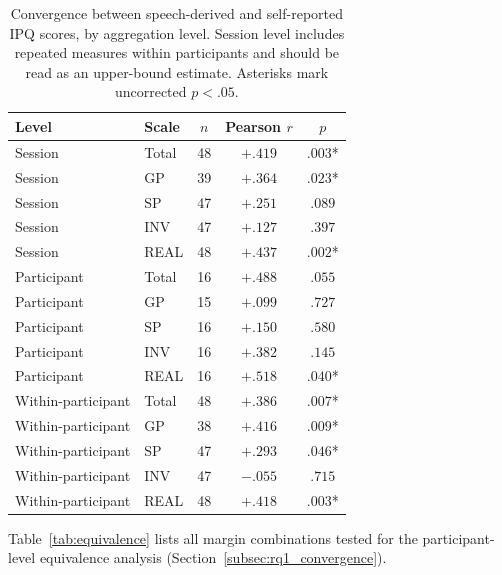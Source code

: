 \begin{table}[htbp]
\centering
\caption{Convergence between speech-derived and self-reported IPQ scores, by aggregation level. Session level includes repeated measures within participants and should be read as an upper-bound estimate. Asterisks mark uncorrected $p<.05$.}
\label{tab:convergence}
\small
\begin{tabular}{llccc}
\hline
Level & Scale & $n$ & Pearson $r$ & $p$ \\
\hline
Session & Total & 48 & $+.419$ & $.003$* \\
Session & GP & 39 & $+.364$ & $.023$* \\
Session & SP & 47 & $+.251$ & $.089$ \\
Session & INV & 47 & $+.127$ & $.397$ \\
Session & REAL & 48 & $+.437$ & $.002$* \\
\hline
Participant & Total & 16 & $+.488$ & $.055$ \\
Participant & GP & 15 & $+.099$ & $.727$ \\
Participant & SP & 16 & $+.150$ & $.580$ \\
Participant & INV & 16 & $+.382$ & $.145$ \\
Participant & REAL & 16 & $+.518$ & $.040$* \\
\hline
Within-participant & Total & 48 & $+.386$ & $.007$* \\
Within-participant & GP & 38 & $+.416$ & $.009$* \\
Within-participant & SP & 47 & $+.293$ & $.046$* \\
Within-participant & INV & 47 & $-.055$ & $.715$ \\
Within-participant & REAL & 48 & $+.418$ & $.003$* \\
\hline
\end{tabular}
\end{table}

Table~\ref{tab:equivalence} lists all margin combinations tested for the participant-level equivalence analysis (Section~\ref{subsec:rq1_convergence}).

